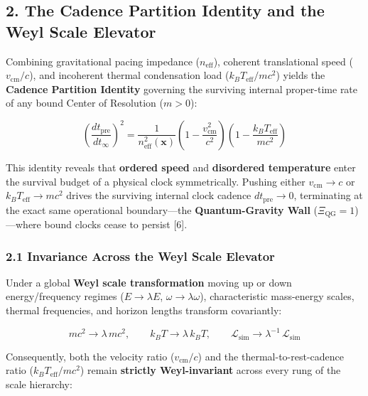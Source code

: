 \documentclass[
]{article}
\begin{document}
\subsection{2. The Cadence Partition Identity and the Weyl Scale
Elevator}\label{the-cadence-partition-identity-and-the-weyl-scale-elevator}

Combining gravitational pacing impedance (\(n_{\mathrm{eff}}\)),
coherent translational speed (\(v_{\mathrm{cm}}/c\)), and incoherent
thermal condensation load (\(k_B T_{\mathrm{eff}} / m c^2\)) yields the
\textbf{Cadence Partition Identity} governing the surviving internal
proper-time rate of any bound Center of Resolution (\(m > 0\)):

\[\left(\frac{dt_{\mathrm{pre}}}{dt_\infty}\right)^2 = \frac{1}{n_{\mathrm{eff}}^2(\mathbf{x})} \left(1 - \frac{v_{\mathrm{cm}}^2}{c^2}\right) \left(1 - \frac{k_B T_{\mathrm{eff}}}{m c^2}\right)\]

This identity reveals that \textbf{ordered speed} and \textbf{disordered
temperature} enter the survival budget of a physical clock
symmetrically. Pushing either \(v_{\mathrm{cm}} \to c\) or
\(k_B T_{\mathrm{eff}} \to m c^2\) drives the surviving internal clock
cadence \(dt_{\mathrm{pre}} \to 0\), terminating at the exact same
operational boundary---the \textbf{Quantum-Gravity Wall}
(\(\Xi_{\mathrm{QG}} = 1\))---where bound clocks cease to persist
{[}6{]}.

\subsubsection{2.1 Invariance Across the Weyl Scale
Elevator}\label{invariance-across-the-weyl-scale-elevator}

Under a global \textbf{Weyl scale transformation} moving up or down
energy/frequency regimes (\(E \to \lambda E\),
\(\omega \to \lambda \omega\)), characteristic mass-energy scales,
thermal frequencies, and horizon lengths transform covariantly:

\[m c^2 \longrightarrow \lambda\,m c^2, \qquad k_B T \longrightarrow \lambda\,k_B T, \qquad \mathcal{L}_{\mathrm{sim}} \longrightarrow \lambda^{-1}\,\mathcal{L}_{\mathrm{sim}}\]

Consequently, both the velocity ratio (\(v_{\mathrm{cm}}/c\)) and the
thermal-to-rest-cadence ratio (\(k_B T_{\mathrm{eff}} / m c^2\)) remain
\textbf{strictly Weyl-invariant} across every rung of the scale
hierarchy:
\end{document}
